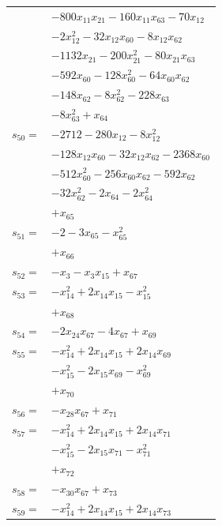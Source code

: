 \begin{longtable}{@{}r@{\;}l@{}}
 & \(\displaystyle -800x_{11}x_{21} -160x_{11}x_{63} -70x_{12}\) \\
 & \(\displaystyle -2x_{12}^{2} -32x_{12}x_{60} -8x_{12}x_{62}\) \\
 & \(\displaystyle -1132x_{21} -200x_{21}^{2} -80x_{21}x_{63}\) \\
 & \(\displaystyle -592x_{60} -128x_{60}^{2} -64x_{60}x_{62}\) \\
 & \(\displaystyle -148x_{62} -8x_{62}^{2} -228x_{63}\) \\
 & \(\displaystyle -8x_{63}^{2} +x_{64}\) \\[3pt]
\(s_{50}=\) & \(\displaystyle -2712 -280x_{12} -8x_{12}^{2}\) \\
 & \(\displaystyle -128x_{12}x_{60} -32x_{12}x_{62} -2368x_{60}\) \\
 & \(\displaystyle -512x_{60}^{2} -256x_{60}x_{62} -592x_{62}\) \\
 & \(\displaystyle -32x_{62}^{2} -2x_{64} -2x_{64}^{2}\) \\
 & \(\displaystyle +x_{65}\) \\[3pt]
\(s_{51}=\) & \(\displaystyle -2 -3x_{65} -x_{65}^{2}\) \\
 & \(\displaystyle +x_{66}\) \\[3pt]
\(s_{52}=\) & \(\displaystyle -x_{3} -x_{3}x_{15} +x_{67}\) \\[3pt]
\(s_{53}=\) & \(\displaystyle -x_{14}^{2} +2x_{14}x_{15} -x_{15}^{2}\) \\
 & \(\displaystyle +x_{68}\) \\[3pt]
\(s_{54}=\) & \(\displaystyle -2x_{24}x_{67} -4x_{67} +x_{69}\) \\[3pt]
\(s_{55}=\) & \(\displaystyle -x_{14}^{2} +2x_{14}x_{15} +2x_{14}x_{69}\) \\
 & \(\displaystyle -x_{15}^{2} -2x_{15}x_{69} -x_{69}^{2}\) \\
 & \(\displaystyle +x_{70}\) \\[3pt]
\(s_{56}=\) & \(\displaystyle -x_{28}x_{67} +x_{71}\) \\[3pt]
\(s_{57}=\) & \(\displaystyle -x_{14}^{2} +2x_{14}x_{15} +2x_{14}x_{71}\) \\
 & \(\displaystyle -x_{15}^{2} -2x_{15}x_{71} -x_{71}^{2}\) \\
 & \(\displaystyle +x_{72}\) \\[3pt]
\(s_{58}=\) & \(\displaystyle -x_{30}x_{67} +x_{73}\) \\[3pt]
\(s_{59}=\) & \(\displaystyle -x_{14}^{2} +2x_{14}x_{15} +2x_{14}x_{73}\) \\

\end{longtable}

